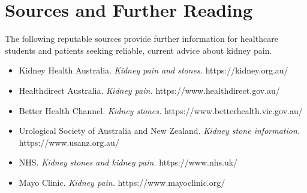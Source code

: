 \section*{Sources and Further Reading}
The following reputable sources provide further information for healthcare students and patients seeking reliable, current advice about kidney pain.
\begin{itemize}
    \item Kidney Health Australia. \textit{Kidney pain and stones.} https://kidney.org.au/
    \item Healthdirect Australia. \textit{Kidney pain.} https://www.healthdirect.gov.au/
    \item Better Health Channel. \textit{Kidney stones.} https://www.betterhealth.vic.gov.au/
    \item Urological Society of Australia and New Zealand. \textit{Kidney stone information.} https://www.usanz.org.au/
    \item NHS. \textit{Kidney stones and kidney pain.} https://www.nhs.uk/
    \item Mayo Clinic. \textit{Kidney pain.} https://www.mayoclinic.org/
\end{itemize}
